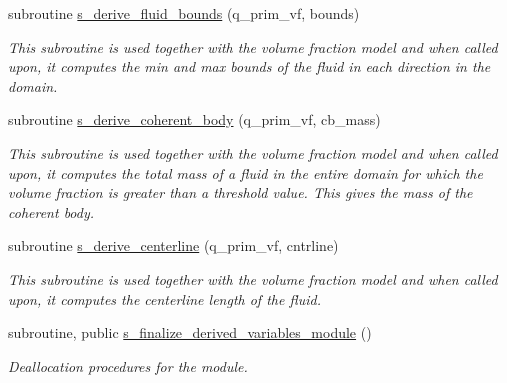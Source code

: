 \begin{DoxyCompactItemize}
subroutine \hyperlink{namespacem__derived__variables_abdf1859a7ad678848feb69bbe89a2f95}{s\+\_\+derive\+\_\+fluid\+\_\+bounds} (q\+\_\+prim\+\_\+vf, bounds)
\begin{DoxyCompactList}\small\item\em This subroutine is used together with the volume fraction model and when called upon, it computes the min and max bounds of the fluid in each direction in the domain. \end{DoxyCompactList}\item 
subroutine \hyperlink{namespacem__derived__variables_a2472e46739cdedf315aefa209a08f211}{s\+\_\+derive\+\_\+coherent\+\_\+body} (q\+\_\+prim\+\_\+vf, cb\+\_\+mass)
\begin{DoxyCompactList}\small\item\em This subroutine is used together with the volume fraction model and when called upon, it computes the total mass of a fluid in the entire domain for which the volume fraction is greater than a threshold value. This gives the mass of the coherent body. \end{DoxyCompactList}\item 
subroutine \hyperlink{namespacem__derived__variables_a976bfd341efaba6840dc23d6abc4f29e}{s\+\_\+derive\+\_\+centerline} (q\+\_\+prim\+\_\+vf, cntrline)
\begin{DoxyCompactList}\small\item\em This subroutine is used together with the volume fraction model and when called upon, it computes the centerline length of the fluid. \end{DoxyCompactList}\item 
subroutine, public \hyperlink{namespacem__derived__variables_a735665bf598281689158d9d6e075f3d4}{s\+\_\+finalize\+\_\+derived\+\_\+variables\+\_\+module} ()
\begin{DoxyCompactList}\small\item\em Deallocation procedures for the module. \end{DoxyCompactList}\end{DoxyCompactItemize}
